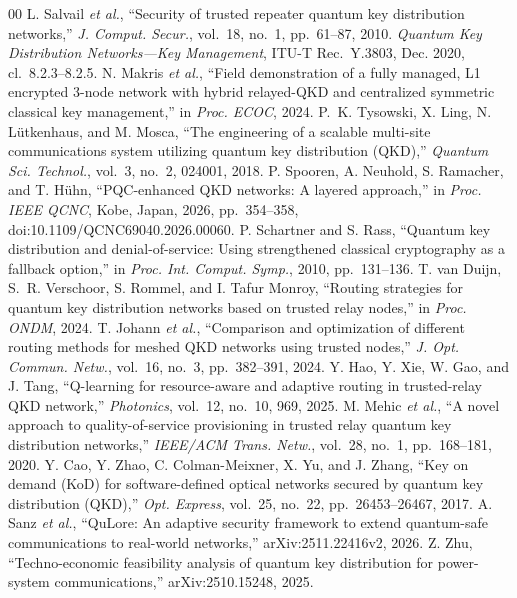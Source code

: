 \documentclass[conference,a4paper]{IEEEtran}
\begin{document}
\begin{thebibliography}{00}
 L. Salvail \emph{et al.}, ``Security of trusted repeater quantum key distribution networks,'' \emph{J. Comput. Secur.}, vol.~18, no.~1, pp.~61--87, 2010.
 \emph{Quantum Key Distribution Networks---Key Management}, ITU-T Rec.~Y.3803, Dec. 2020, cl.~8.2.3--8.2.5.
 N. Makris \emph{et al.}, ``Field demonstration of a fully managed, L1 encrypted 3-node network with hybrid relayed-QKD and centralized symmetric classical key management,'' in \emph{Proc. ECOC}, 2024.
 P.~K. Tysowski, X. Ling, N. L\"utkenhaus, and M. Mosca, ``The engineering of a scalable multi-site communications system utilizing quantum key distribution (QKD),'' \emph{Quantum Sci. Technol.}, vol.~3, no.~2, 024001, 2018.
 P. Spooren, A. Neuhold, S. Ramacher, and T. H\"uhn, ``PQC-enhanced QKD networks: A layered approach,'' in \emph{Proc. IEEE QCNC}, Kobe, Japan, 2026, pp.~354--358, doi:10.1109/QCNC69040.2026.00060.
 P. Schartner and S. Rass, ``Quantum key distribution and denial-of-service: Using strengthened classical cryptography as a fallback option,'' in \emph{Proc. Int. Comput. Symp.}, 2010, pp.~131--136.
 T. van Duijn, S.~R. Verschoor, S. Rommel, and I. Tafur Monroy, ``Routing strategies for quantum key distribution networks based on trusted relay nodes,'' in \emph{Proc. ONDM}, 2024.
 T. Johann \emph{et al.}, ``Comparison and optimization of different routing methods for meshed QKD networks using trusted nodes,'' \emph{J. Opt. Commun. Netw.}, vol.~16, no.~3, pp.~382--391, 2024.
 Y. Hao, Y. Xie, W. Gao, and J. Tang, ``Q-learning for resource-aware and adaptive routing in trusted-relay QKD network,'' \emph{Photonics}, vol.~12, no.~10, 969, 2025.
 M. Mehic \emph{et al.}, ``A novel approach to quality-of-service provisioning in trusted relay quantum key distribution networks,'' \emph{IEEE/ACM Trans. Netw.}, vol.~28, no.~1, pp.~168--181, 2020.
 Y. Cao, Y. Zhao, C. Colman-Meixner, X. Yu, and J. Zhang, ``Key on demand (KoD) for software-defined optical networks secured by quantum key distribution (QKD),'' \emph{Opt. Express}, vol.~25, no.~22, pp.~26453--26467, 2017.
 A. Sanz \emph{et al.}, ``QuLore: An adaptive security framework to extend quantum-safe communications to real-world networks,'' arXiv:2511.22416v2, 2026.
 Z. Zhu, ``Techno-economic feasibility analysis of quantum key distribution for power-system communications,'' arXiv:2510.15248, 2025.

\end{thebibliography}
\end{document}
